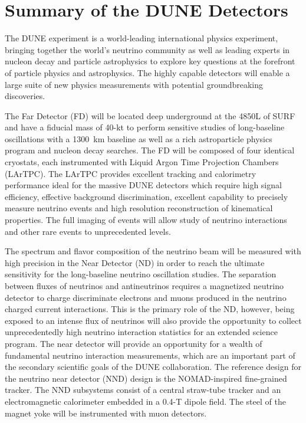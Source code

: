 \chapter{Summary of the DUNE Detectors}
\label{ch:physics-summary}

The DUNE experiment is a world-leading international physics
experiment, bringing together the world's neutrino community as well
as leading experts in nucleon decay and particle astrophysics to
explore key questions at the forefront of particle physics and
astrophysics. The highly capable detectors will enable a
large suite of new physics measurements with potential groundbreaking
discoveries.

The Far Detector (FD) will be located deep underground at the 4850L of
SURF and have a fiducial mass of 40-kt to perform sensitive studies of
long-baseline oscillations with a 1300~km baseline as well as a rich
astroparticle physics program and nucleon decay searches. The FD
will be composed of four identical cryostats, each instrumented with
Liquid Argon Time Projection Chambers (LArTPC). The LArTPC provides
excellent tracking and calorimetry performance ideal for the massive
DUNE detectors which require high signal efficiency, effective
background discrimination, excellent capability to precisely measure
neutrino events and high resolution reconstruction of kinematical
properties. The full imaging of events will allow study of neutrino
interactions and other rare events to unprecedented levels.

The spectrum and flavor composition of the neutrino beam will be
measured with high precision in the Near Detector (ND) in order to
reach the ultimate sensitivity for the long-baseline neutrino
oscillation studies.  The separation between fluxes of neutrinos and
antineutrinos requires a magnetized neutrino detector to charge
discriminate electrons and muons produced in the neutrino charged
current interactions.  This is the primary role of the ND, however,
being exposed to an intense flux of neutrinos will also provide the
opportunity to collect unprecedentedly high neutrino
interaction statistics for an extended science program.  The near detector will
provide an opportunity for a wealth of fundamental neutrino
interaction measurements, which are an important part of the secondary
scientific goals of the DUNE collaboration.  The reference design for
the neutrino near detector (NND) design is the NOMAD-inspired
fine-grained tracker. The NND subsystems consist of a central
straw-tube tracker and an electromagnetic calorimeter embedded in a
0.4-T dipole field. The steel of the magnet yoke will be instrumented
with muon detectors.
